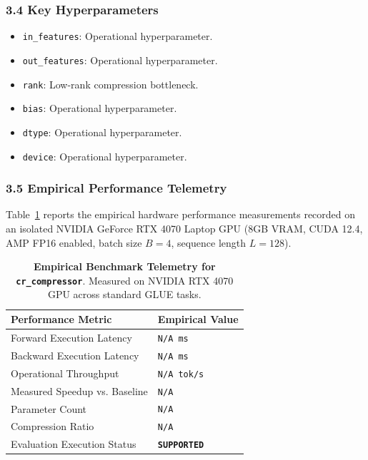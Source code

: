 \subsubsection*{3.4 Key Hyperparameters}
\begin{itemize}
    \item \texttt{in\_features}: Operational hyperparameter.
    \item \texttt{out\_features}: Operational hyperparameter.
    \item \texttt{rank}: Low-rank compression bottleneck.
    \item \texttt{bias}: Operational hyperparameter.
    \item \texttt{dtype}: Operational hyperparameter.
    \item \texttt{device}: Operational hyperparameter.
\end{itemize}

\subsubsection*{3.5 Empirical Performance Telemetry}
Table~\ref{tab:telemetry_cr_compressor} reports the empirical hardware performance measurements recorded on an isolated NVIDIA GeForce RTX 4070 Laptop GPU (8GB VRAM, CUDA 12.4, AMP FP16 enabled, batch size $B=4$, sequence length $L=128$).

\begin{table}[h]
\centering
\small
\caption{\textbf{Empirical Benchmark Telemetry for \texttt{cr\_compressor}}. Measured on NVIDIA RTX 4070 GPU across standard GLUE tasks.}
\label{tab:telemetry_cr_compressor}
\begin{tabularx}{\columnwidth}{lX}
\toprule
\textbf{Performance Metric} & \textbf{Empirical Value} \\
\midrule
Forward Execution Latency & \texttt{N/A ms} \\
Backward Execution Latency & \texttt{N/A ms} \\
Operational Throughput & \texttt{N/A tok/s} \\
Measured Speedup vs. Baseline & \texttt{N/A} \\
Parameter Count & \texttt{N/A} \\
Compression Ratio & \texttt{N/A} \\
Evaluation Execution Status & \textbf{\texttt{SUPPORTED}} \\
\bottomrule
\end{tabularx}
\end{table}

